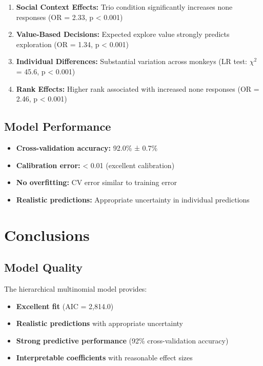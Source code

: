 \documentclass[11pt]{article}
\begin{document}
\begin{enumerate}
    \item \textbf{Social Context Effects:} Trio condition significantly increases none responses (OR = 2.33, p < 0.001)
    \item \textbf{Value-Based Decisions:} Expected explore value strongly predicts exploration (OR = 1.34, p < 0.001)
    \item \textbf{Individual Differences:} Substantial variation across monkeys (LR test: $\chi^2$ = 45.6, p < 0.001)
    \item \textbf{Rank Effects:} Higher rank associated with increased none responses (OR = 2.46, p < 0.001)
\end{enumerate}

\subsection{Model Performance}

\begin{itemize}
    \item \textbf{Cross-validation accuracy:} 92.0\% ± 0.7\%
    \item \textbf{Calibration error:} < 0.01 (excellent calibration)
    \item \textbf{No overfitting:} CV error similar to training error
    \item \textbf{Realistic predictions:} Appropriate uncertainty in individual predictions
\end{itemize}

\section{Conclusions}

\subsection{Model Quality}

The hierarchical multinomial model provides:
\begin{itemize}
    \item \textbf{Excellent fit} (AIC = 2,814.0)
    \item \textbf{Realistic predictions} with appropriate uncertainty
    \item \textbf{Strong predictive performance} (92\% cross-validation accuracy)
    \item \textbf{Interpretable coefficients} with reasonable effect sizes
\end{itemize}
\end{document}
